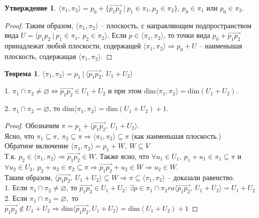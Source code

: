 \documentclass[a4paper, 12pt]{article}
\theoremstyle{definition}
\newtheorem*{theorem}{Теорема}
\newtheorem*{subtheorem}{Утверждение}
\begin{document}
    \begin{subtheorem}
        $\langle \pi_1,\pi_2 \rangle = p_0 + \{\overrightarrow
        {p_1p_2}\ |\ p_1 \in \pi_1, p_2 \in \pi_2\}$, 
        $p_0 \in \pi_1$ или $p_0 \in \pi_2$.  
    \end{subtheorem}
    \begin{proof}
        Таким образом, $\langle \pi_1, \pi_2 \rangle$ -- 
        плоскость, с направляющим подпространством вида $U = 
        \langle p_1p_2\ |\ p_1 \in \pi_1,\ p_2 \in 
        \pi_2\rangle$. Если $p \in \langle \pi_1, \pi_2 
        \rangle$, то точки вида $p_0 + \overrightarrow{p_1p_2}
        $ принадлежат любой плоскости, содержащей $\langle 
        \pi_1, \pi_2 \rangle \Longrightarrow p_0 + U$ -- 
        наименьшая плоскость, содержащая $\langle \pi_1, \pi_2 
        \rangle$. 

    \end{proof}
    \begin{theorem}
        $\langle \pi_1, \pi_2\rangle = p_1\ |\ \langle
        \overrightarrow{p_1p_2},\ U_1 + U_2\rangle$

        1. $\pi_1 \cap \pi_2 \neq \varnothing 
        \Longleftrightarrow \overrightarrow{p_1p_2} \in U_1 + 
        U_2$ и при этом $\text{dim}\langle \pi_1, \pi_2\rangle
        = \text{dim} (U_1 + U_2)$.

        2. $\pi_1 \cap \pi_2 = \varnothing$, то $\text{dim}
        \langle \pi_1,\pi_2\rangle = \text{dim}(U_1 + U_2) + 1.
        $ 
    \end{theorem}
    \begin{proof}
        Обозначим $\pi = p_1 + \langle \overrightarrow{p_1p_2},
        \ U_1 + U_2 \rangle$.\\ Ясно, что $\pi_1 \subseteq \pi,\
        \pi_2 \subseteq \pi \Longrightarrow \langle \pi_1, 
        \pi_2 \rangle \subseteq \pi$ (как наименьшая 
        плоскость.)\\
        Обратное включение $\langle \pi_1, \pi_2\rangle = p_1 + 
        W,\ W \subseteq V$\\
        Т.к. $p_2 \in \langle \pi_1, \pi_2\rangle 
        \Longrightarrow \overrightarrow{p_1p_2} \in W$.
        Также ясно, что $\forall u_1 \in U_1,\ p_1 + u_1 \in 
        \pi_1 \subseteq \pi$ и\\
        $\forall u_2 \in U_2,\ p_2 + u_2 \in 
        \pi_2 \subseteq \pi \Longrightarrow \overrightarrow
        {p_1p_2} + u_2 \in W \Longrightarrow u_2 \in W$.\\
        Таким образом, $\langle \overrightarrow{p_1p_2},\ U_1 + 
        U_2\rangle \subseteq W \Longrightarrow \pi \subseteq 
        \langle \pi_1, \pi_2 \rangle $ -- доказали равенство.\\
        1. Если $\pi_1 \cap \pi_2 \neq \varnothing$, то 
        $\overrightarrow{p_1p_2} \in U_1 + U_2:\ \exists p \in 
        \pi_1\cap \pi_2 ra
        \langle\overrightarrow{p_1p_2},\ U_1 + U_2\rangle = 
        U_1 + U_2$
        2. Если $\pi_1 \cap \pi_2 = \varnothing,$ то 
        $\overrightarrow{p_1p_2} \not \in U_1 + U_2 
        \Longrightarrow \text{dim} \langle\overrightarrow
        {p_1p_2}, U_1 + U_2\rangle = \text{dim}(U_1 + U_2) + 1$
        
    \end{proof}
\end{document}
